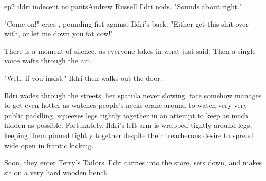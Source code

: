\documentclass{book}
\begin{document}
\begin{childnode}{ep2 ildri indecent no pants}{Andrew Russell}
Ildri nods. "Sounds about right."

"Come on!" cries \name{}, pounding \hisher{} fist against Ildri's back. "Either get this shit over with, or let me down you fat cow!"

There is a moment of silence, as everyone takes in what \name{} just said. Then a single voice wafts through the air.


"Well, if you insist." Ildri  then 
    walks out the door.





    Ildri wades through the streets, her spatula never slowing. \names{} face somehow manages to get even hotter as \heshe{} watches people's necks crane around to watch \hisher{} very very public
    paddling. \HeShe{} squeezes \hisher{} legs tightly together in an attempt to keep as much hidden as possible. Fortunately, Ildri's left arm is wrapped tightly around \names{} legs, keeping them
    pinned tightly together despite their treacherous desire to spread wide open in frantic kicking.

    Soon, they enter Terry's Tailors. Ildri carries \name{} into the store, sets \name{} down, and makes \himher{} sit on a very hard wooden
    bench.
    

\end{childnode}
\end{document}
